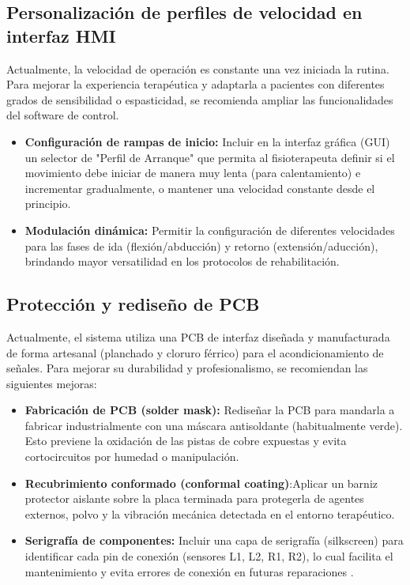 \subsection*{Personalización de perfiles de velocidad en interfaz HMI}
Actualmente, la velocidad de operación es constante una vez iniciada la rutina. Para mejorar la experiencia terapéutica y adaptarla a pacientes con diferentes grados de sensibilidad o espasticidad, se recomienda ampliar las funcionalidades del software de control.
\begin{itemize}
    \item \textbf{Configuración de rampas de inicio:} Incluir en la interfaz gráfica (GUI) un selector de "Perfil de Arranque" que permita al fisioterapeuta definir si el movimiento debe iniciar de manera muy lenta (para calentamiento) e incrementar gradualmente, o mantener una velocidad constante desde el principio.
    \item \textbf{Modulación dinámica:} Permitir la configuración de diferentes velocidades para las fases de ida (flexión/abducción) y retorno (extensión/aducción), brindando mayor versatilidad en los protocolos de rehabilitación.
\end{itemize}

\subsection*{Protección y rediseño de PCB}
Actualmente, el sistema utiliza una PCB de interfaz diseñada y manufacturada de forma artesanal (planchado y cloruro férrico) para el acondicionamiento de señales. Para mejorar su durabilidad y profesionalismo, se recomiendan las siguientes mejoras:
\begin{itemize}
    \item \textbf{Fabricación de PCB (solder mask): }Rediseñar la PCB para mandarla a fabricar industrialmente con una máscara antisoldante (habitualmente verde). Esto previene la oxidación de las pistas de cobre expuestas y evita cortocircuitos por humedad o manipulación.
    \item \textbf{Recubrimiento conformado (conformal coating)}:Aplicar un barniz protector aislante sobre la placa terminada para protegerla de agentes externos, polvo y la vibración mecánica detectada en el entorno terapéutico.
    \item \textbf{Serigrafía de componentes:} Incluir una capa de serigrafía (silkscreen) para identificar cada pin de conexión (sensores L1, L2, R1, R2), lo cual facilita el mantenimiento y evita errores de conexión en futuras reparaciones .
\end{itemize}
\endinput 